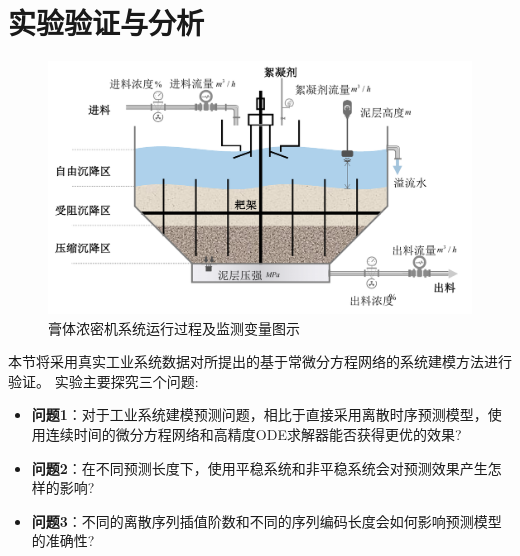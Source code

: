 \section{实验验证与分析}
\label{sec:case}

\begin{figure}[t]
\centering
\includegraphics[width=\linewidth]{figures/chapter3/thickener.pdf}
\caption{
膏体浓密机系统运行过程及监测变量图示
}
\label{fig:nfca_thickener}
\end{figure}

本节将采用真实工业系统数据对所提出的基于常微分方程网络的系统建模方法进行验证。
实验主要探究三个问题:
\begin{itemize}
\item \textbf{问题1}：对于工业系统建模预测问题，相比于直接采用离散时序预测模型，使用连续时间的微分方程网络和高精度ODE求解器能否获得更优的效果?
\item \textbf{问题2}：在不同预测长度下，使用平稳系统和非平稳系统会对预测效果产生怎样的影响?
\item \textbf{问题3}：不同的离散序列插值阶数和不同的序列编码长度会如何影响预测模型的准确性?
\end{itemize}

